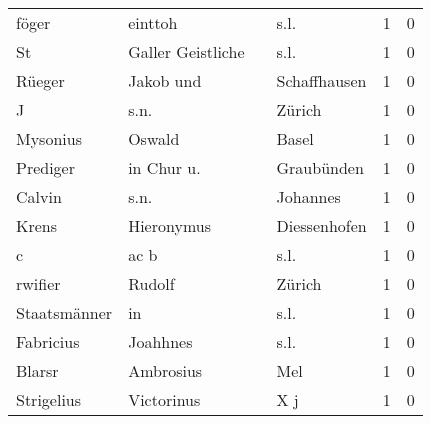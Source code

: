 \documentclass[10pt,a4paper,landscape]{article}
\begin{document}
\begin{longtable}{llllrr}
                    föger &                            einttoh &             &                                        s.l. &          1 &         0 \\
                       St &                  Galler Geistliche &             &                                        s.l. &          1 &         0 \\
                   Rüeger &                          Jakob und &             &                                Schaffhausen &          1 &         0 \\
                        J &                               s.n. &             &                                      Zürich &          1 &         0 \\
                 Mysonius &                             Oswald &             &                                       Basel &          1 &         0 \\
                 Prediger &                         in Chur u. &             &                                  Graubünden &          1 &         0 \\
                   Calvin &                               s.n. &             &                                    Johannes &          1 &         0 \\
                    Krens &                         Hieronymus &             &                                Diessenhofen &          1 &         0 \\
                        c &                               ac b &             &                                        s.l. &          1 &         0 \\
                  rwifier &                             Rudolf &             &                                      Zürich &          1 &         0 \\
             Staatsmänner &                                 in &             &                                        s.l. &          1 &         0 \\
                Fabricius &                           Joahhnes &             &                                        s.l. &          1 &         0 \\
                   Blarsr &                          Ambrosius &             &                                         Mel &          1 &         0 \\
               Strigelius &                         Victorinus &             &                                         X j &          1 &         0 \\

\end{longtable}
\end{document}
